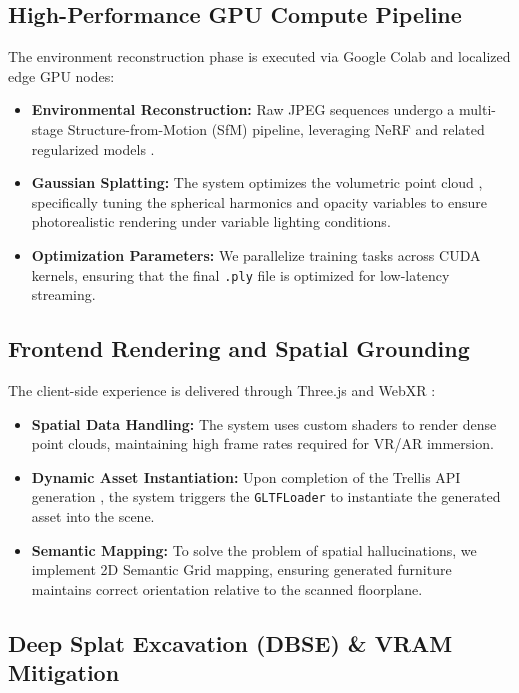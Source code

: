 \documentclass[11pt, a4paper]{article}
\begin{document}
\subsection{High-Performance GPU Compute Pipeline}
The environment reconstruction phase is executed via Google Colab and localized edge GPU nodes:
\begin{itemize}
    \item \textbf{Environmental Reconstruction:} Raw JPEG sequences undergo a multi-stage Structure-from-Motion (SfM) pipeline, leveraging NeRF \cite{mildenhall2020nerf} and related regularized models \cite{jain2021dietnerf, niemeyer2022regnerf}.
    \item \textbf{Gaussian Splatting:} The system optimizes the volumetric point cloud \cite{luiten2023dynamic3d, kerbl20233d}, specifically tuning the spherical harmonics and opacity variables to ensure photorealistic rendering under variable lighting conditions.
    \item \textbf{Optimization Parameters:} We parallelize training tasks across CUDA kernels, ensuring that the final \texttt{.ply} file is optimized for low-latency streaming.
\end{itemize}

\subsection{Frontend Rendering and Spatial Grounding}
The client-side experience is delivered through Three.js \cite{threejs} and WebXR \cite{webxr}:
\begin{itemize}
    \item \textbf{Spatial Data Handling:} The system uses custom shaders to render dense point clouds, maintaining high frame rates required for VR/AR immersion.
    \item \textbf{Dynamic Asset Instantiation:} Upon completion of the Trellis API generation \cite{xiang2025trellis2, xiang2025native}, the system triggers the \texttt{GLTFLoader} to instantiate the generated asset into the scene.
    \item \textbf{Semantic Mapping:} To solve the problem of spatial hallucinations, we implement 2D Semantic Grid mapping, ensuring generated furniture maintains correct orientation relative to the scanned floorplane.
\end{itemize}

\subsection{Deep Splat Excavation (DBSE) \& VRAM Mitigation}
\end{document}
